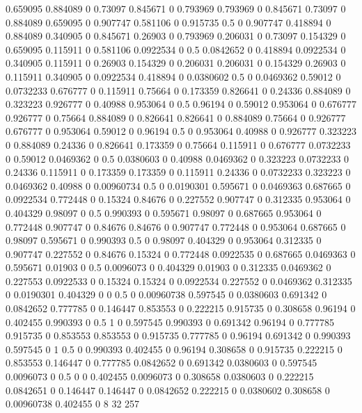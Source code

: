 0.659095 0.884089 0
0.73097 0.845671 0
0.793969 0.793969 0
0.845671 0.73097 0
0.884089 0.659095 0
0.907747 0.581106 0
0.915735 0.5 0
0.907747 0.418894 0
0.884089 0.340905 0
0.845671 0.26903 0
0.793969 0.206031 0
0.73097 0.154329 0
0.659095 0.115911 0
0.581106 0.0922534 0
0.5 0.0842652 0
0.418894 0.0922534 0
0.340905 0.115911 0
0.26903 0.154329 0
0.206031 0.206031 0
0.154329 0.26903 0
0.115911 0.340905 0
0.0922534 0.418894 0
0.0380602 0.5 0
0.0469362 0.59012 0
0.0732233 0.676777 0
0.115911 0.75664 0
0.173359 0.826641 0
0.24336 0.884089 0
0.323223 0.926777 0
0.40988 0.953064 0
0.5 0.96194 0
0.59012 0.953064 0
0.676777 0.926777 0
0.75664 0.884089 0
0.826641 0.826641 0
0.884089 0.75664 0
0.926777 0.676777 0
0.953064 0.59012 0
0.96194 0.5 0
0.953064 0.40988 0
0.926777 0.323223 0
0.884089 0.24336 0
0.826641 0.173359 0
0.75664 0.115911 0
0.676777 0.0732233 0
0.59012 0.0469362 0
0.5 0.0380603 0
0.40988 0.0469362 0
0.323223 0.0732233 0
0.24336 0.115911 0
0.173359 0.173359 0
0.115911 0.24336 0
0.0732233 0.323223 0
0.0469362 0.40988 0
0.00960734 0.5 0
0.0190301 0.595671 0
0.0469363 0.687665 0
0.0922534 0.772448 0
0.15324 0.84676 0
0.227552 0.907747 0
0.312335 0.953064 0
0.404329 0.98097 0
0.5 0.990393 0
0.595671 0.98097 0
0.687665 0.953064 0
0.772448 0.907747 0
0.84676 0.84676 0
0.907747 0.772448 0
0.953064 0.687665 0
0.98097 0.595671 0
0.990393 0.5 0
0.98097 0.404329 0
0.953064 0.312335 0
0.907747 0.227552 0
0.84676 0.15324 0
0.772448 0.0922535 0
0.687665 0.0469363 0
0.595671 0.01903 0
0.5 0.0096073 0
0.404329 0.01903 0
0.312335 0.0469362 0
0.227553 0.0922533 0
0.15324 0.15324 0
0.0922534 0.227552 0
0.0469362 0.312335 0
0.0190301 0.404329 0
0 0.5 0
0.00960738 0.597545 0
0.0380603 0.691342 0
0.0842652 0.777785 0
0.146447 0.853553 0
0.222215 0.915735 0
0.308658 0.96194 0
0.402455 0.990393 0
0.5 1 0
0.597545 0.990393 0
0.691342 0.96194 0
0.777785 0.915735 0
0.853553 0.853553 0
0.915735 0.777785 0
0.96194 0.691342 0
0.990393 0.597545 0
1 0.5 0
0.990393 0.402455 0
0.96194 0.308658 0
0.915735 0.222215 0
0.853553 0.146447 0
0.777785 0.0842652 0
0.691342 0.0380603 0
0.597545 0.0096073 0
0.5 0 0
0.402455 0.0096073 0
0.308658 0.0380603 0
0.222215 0.0842651 0
0.146447 0.146447 0
0.0842652 0.222215 0
0.0380602 0.308658 0
0.00960738 0.402455 0
8 32 257
